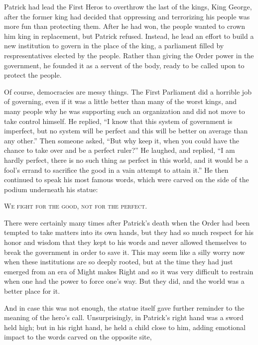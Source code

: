 \documentclass[showtrims,b6paper,draft,10pt]{memoir}
\begin{document}
Patrick had lead the First Heros to overthrow the last of the kings, King George, after the former king had decided that oppressing and terrorizing his people was more fun than protecting them.  After he had won, the people wanted to crown him king in replacement, but Patrick refused.  Instead, he lead an effort to build a new institution to govern in the place of the king, a parliament filled by respresentatives elected by the people.  Rather than giving the Order power in the government, he founded it as a servent of the body, ready to be called upon to protect the people.

Of course, democracies are messy things.  The First Parliament did a horrible job of governing, even if it was a little better than many of the worst kings, and many people why he was supporting such an organization and did not move to take control himself.  He replied, ``I know that this system of government is imperfect, but no system will be perfect and this will be better on average than any other.''  Then someone asked, ``But why keep it, when you could have the chance to take over and be a perfect ruler?''  He laughed, and replied, ``I am hardly perfect, there is no such thing as perfect in this world, and it would be a fool's errand to sacrifice the good in a vain attempt to attain it.''  He then continued to speak his most famous words, which were carved on the side of the podium underneath his statue:

\begin{center}
\textsc{We fight for the good, not for the perfect.}
\end{center}

There were certainly many times after Patrick's death when the Order had been tempted to take matters into its own hands, but they had so much respect for his honor and wisdom that they kept to his words and never allowed themselves to break the government in order to save it.  This may seem like a silly worry now when these institutions are so deeply rooted, but at the time they had just emerged from an era of Might makes Right and so it was very difficult to restrain when one had the power to force one's way.  But they did, and the world was a better place for it.

And in case this was not enough, the statue itself gave further reminder to the meaning of the hero's call.  Unsurprisingly, in Patrick's right hand was a sword held high;  but in his right hand, he held a child close to him, adding emotional impact to the words carved on the opposite site,
\end{document}
